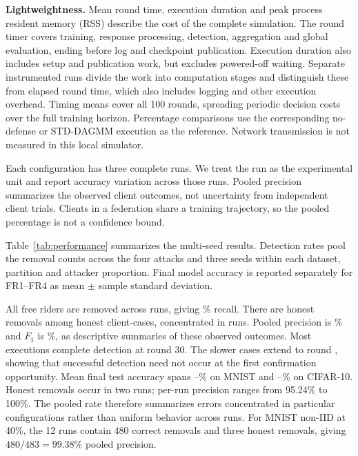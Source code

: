 \documentclass[conference]{IEEEtran}
\makeatletter
\renewcommand{\subsection}{\@startsection{subsection}{2}{\z@}{1.5ex}{0.7ex}{\normalfont\normalsize\itshape}}
\makeatother
\begin{document}
\textbf{Lightweightness.} Mean round time, execution duration and peak
process resident memory (RSS) describe the cost of the complete simulation.
The round timer covers training, response processing, detection,
aggregation and global evaluation, ending before log and checkpoint
publication. Execution duration also includes setup and publication work,
but excludes powered-off waiting. Separate instrumented runs divide the
work into computation stages and distinguish these from elapsed round
time, which also includes logging and other execution overhead. Timing means
cover all 100 rounds, spreading periodic decision costs over the full
training horizon. Percentage comparisons use the corresponding
no-defense or STD-DAGMM execution as the reference. Network transmission
is not measured in this local simulator.

Each configuration has three complete runs. We treat the run as the
experimental unit and report accuracy variation across those runs.
Pooled precision summarizes the observed client outcomes, not uncertainty
from independent client trials. Clients in a federation share a training
trajectory, so the pooled percentage is not a confidence bound.
\endgroup

\subsection{Permanent Detection and Model Utility}
Table~\ref{tab:performance} summarizes the multi-seed results. Detection
rates pool the removal counts across the four attacks and three seeds
within each dataset, partition and attacker proportion. Final model accuracy is reported
separately for FR1--FR4 as mean $\pm$ sample standard deviation.

All free riders are removed across \ReviewRunCount{} runs, giving
\MultiRecall\% recall. There are \MultiFP{} honest removals among
\ReviewHonestCases{} honest client-cases, concentrated in
\ReviewAffectedRuns{} runs. Pooled precision is \MultiPrecision\% and
$F_1$ is \MultiFone\%, as descriptive summaries of these observed outcomes.
Most executions complete detection at round 30. The slower cases extend
to round \MultiCompletionMax{}, showing that successful detection need
not occur at the first confirmation opportunity. Mean final test
accuracy spans \MultiMnistAccuracyMin--\MultiMnistAccuracyMax\% on MNIST
and \MultiCifarAccuracyMin--\MultiCifarAccuracyMax\% on CIFAR-10.
Honest removals occur in two runs; per-run precision ranges from 95.24\%
to 100\%. The pooled rate therefore summarizes errors concentrated in
particular configurations rather than uniform behavior across runs.
For MNIST non-IID at 40\%, the 12 runs contain 480 correct removals
and three honest removals, giving $480/483=99.38\%$ pooled precision.
\end{document}
